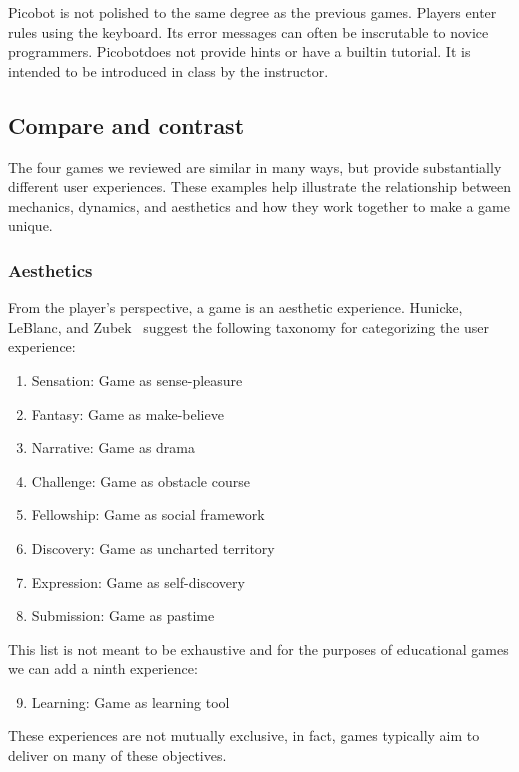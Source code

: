 \documentclass{sig-alternate-05-2015}
\begin{document}
Picobot is not polished to the same degree as the previous games. Players enter rules using the keyboard. Its error messages can often be inscrutable to novice programmers. Picobot{\em  }does not provide hints or have a builtin tutorial. It is intended to be introduced in class by the instructor. \subsection{Compare and contrast}


The four games we reviewed are similar in many ways, but provide substantially different user experiences. These examples help illustrate the relationship between mechanics, dynamics, and aesthetics and how they work together to make a game unique. \subsubsection{Aesthetics}


From the player's perspective, a game is an aesthetic experience. Hunicke, LeBlanc, and Zubek~\cite{hunicke2004mda} suggest the following taxonomy for categorizing the user experience:

\begin{enumerate}
\setcounter{enumi}{0}
\item Sensation: Game as sense-pleasure 
\item Fantasy: Game as make-believe 
\item Narrative: Game as drama 
\item Challenge: Game as obstacle course 
\item Fellowship: Game as social framework 
\item Discovery: Game as uncharted territory 
\item Expression: Game as self-discovery 
\item Submission: Game as pastime
\end{enumerate}




This list is not meant to be exhaustive and for the purposes of educational games we can add a ninth experience:

\begin{enumerate}
\setcounter{enumi}{8}
\item Learning: Game as learning tool
\end{enumerate}




These experiences are not mutually exclusive, in fact, games typically aim to deliver on many of these objectives. 
\end{document}
